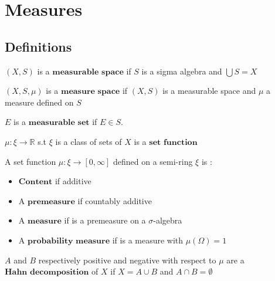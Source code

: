 \section{Measures}

\subsection{Definitions}

$(X,S)$ is a $\textbf{measurable space}$ if $S$ is a sigma algebra and $\bigcup S = X$

$(X,S,\mu)$ is a $\textbf{measure space}$ if $(X,S)$ is a measurable space and $\mu$ a measure defined on $S$

$E$ is a $\textbf{measurable set}$ if $E\in S$.

$\mu : \xi \rightarrow \mathbb{R}$ s.t $\xi$ is a class of sets of $X$ is a $\textbf{set function}$

A set function $\mu : \xi \rightarrow [0, \infty]$ defined on a semi-ring $\xi$ is :

\begin{itemize}
\item $\textbf{Content}$ if additive
\item A $\textbf{premeasure}$ if countably additive
\item A $\textbf{measure}$ if is a premeasure on a $\sigma$-algebra
\item A $\textbf{probability measure}$ if is a measure with $\mu(\Omega) = 1$
\end{itemize}

$A$ and $B$ respectively positive and negative  with respect to $\mu$ are a $\textbf{Hahn decomposition}$ of $X$ if $X = A \cup B$ and $A \cap B = \emptyset$ 

